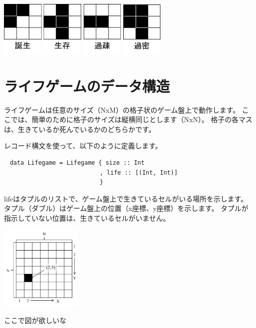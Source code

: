 \documentclass{jsarticle}
\begin{document}
\begin{center}
 \includegraphics[width=2cm]{reproduction.png}
 \includegraphics[width=2cm]{next-generation.png}
 \includegraphics[width=2cm]{under-population.png}
 \includegraphics[width=2cm]{overcrowding.png}
\end{center}

\section{ライフゲームのデータ構造}
ライフゲームは任意のサイズ（NxM）の格子状のゲーム盤上で動作します。
ここでは、簡単のために格子のサイズは縦横同じとします（NxN）。
格子の各マスは、生きているか死んでいるかのどちらかです。

レコード構文を使って、以下のように定義します。
\begin{verbatim}
　data Lifegame = Lifegame { size :: Int
                           , life :: [(Int, Int)]
                           }
\end{verbatim}

lifeはタプルのリストで、ゲーム盤上で生きているセルがいる場所を示します。
タプル（ダブル）はゲーム盤上の位置（x座標、y座標）を示します。
タプルが指示していない位置は、生きているセルがいません。

\begin{center}
 \includegraphics[width=4cm]{gameboard.png}
\end{center}


ここで図が欲しいな~
\end{document}
